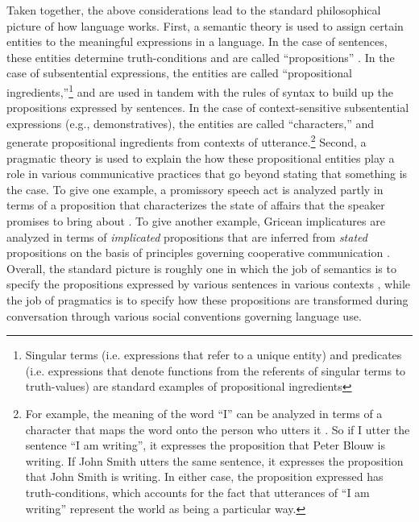 Taken together, the above considerations lead to the standard philosophical picture of how language works. First, a semantic theory is used to assign certain entities to the meaningful expressions in a language. In the case of sentences, these entities determine truth-conditions and are called ``propositions'' \citep{Speaks:2014}. In the case of subsentential expressions, the entities are called ``propositional ingredients,''\footnote{Singular terms (i.e. expressions that refer to a unique entity) and predicates (i.e. expressions that denote functions from the referents of singular terms to truth-values) are standard examples of propositional ingredients} and are used in tandem with the rules of syntax to build up the propositions expressed by sentences. In the case of context-sensitive subsentential expressions (e.g., demonstratives), the entities are called ``characters,'' and generate propositional ingredients from contexts of utterance.\footnote{For example, the meaning of the word ``I'' can be analyzed in terms of a character that maps the word onto the person who utters it \citep{Stanley:2008}. So if I utter the sentence ``I am writing'', it expresses the proposition that Peter Blouw is writing. If John Smith utters the same sentence, it expresses the proposition that John Smith is writing. In either case, the proposition expressed has truth-conditions, which accounts for the fact that utterances of ``I am writing'' represent the world as being a particular way.} Second, a pragmatic theory is used to explain the how these propositional entities play a role in various communicative practices that go beyond stating that something is the case. To give one example, a promissory speech act is analyzed partly in terms of a proposition that characterizes the state of affairs that the speaker promises to bring about \citep{KortaPerry:2015}. To give another example, Gricean implicatures are analyzed in terms of \textit{implicated} propositions that are inferred from \textit{stated} propositions on the basis of principles governing cooperative communication \citep{Grice:1975,KortaPerry:2015}. Overall, the standard picture is roughly one in which the job of semantics is to specify the propositions expressed by various sentences in various contexts \citep{Soames:2010,Recanati:2012,CappelenLepore:2005}, while the job of pragmatics is to specify how these propositions are transformed during conversation through various social conventions governing language use. 

